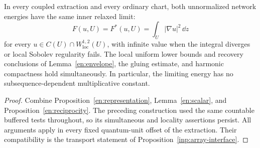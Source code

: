 \begin{theorem}\label{en:variational}
In every coupled extraction and every ordinary chart, both unnormalized
network energies have the same inner relaxed limit:
\begin{equation}\label{en:final-energy}
                   F(u,U)=F^*(u,U)=\int_U|\nabla u|^2\,\dd z
\end{equation}
for every $u\in C(U)\cap W^{1,2}_{\mathrm{loc}}(U)$, with infinite value
when the integral diverges or local Sobolev regularity fails.  The local
uniform lower bounds and recovery conclusions of
Lemma~\ref{en:envelope}, the gluing estimate, and harmonic compactness
hold simultaneously.  In particular, the limiting energy has no
subsequence-dependent multiplicative constant.
\end{theorem}

\begin{proof}
Combine Proposition~\ref{en:representation}, Lemma~\ref{en:scalar}, and
Proposition~\ref{en:reciprocity}.  The preceding construction used the
same countable buffered tests throughout, so its simultaneous and
locality assertions persist.  All arguments apply in every fixed
quantum-unit offset of the extraction.  Their compatibility is the
transport statement of Proposition~\ref{inp:array-interface}.
\end{proof}

